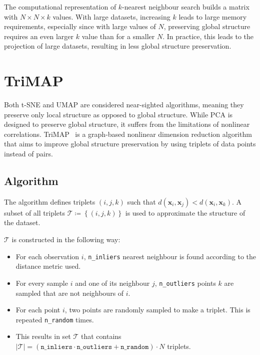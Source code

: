 The computational representation of $k$-nearest neighbour search builds a matrix with $N \times N \times k$ values. With large datasets, increasing $k$ leads to large memory requirements, especially since with large values of $N$, preserving global structure requires an even larger $k$ value than for a smaller $N$. In practice, this leads to the projection of large datasets, resulting in less global structure preservation.

\section{TriMAP}\label{sec:trimap}

Both t-SNE and UMAP are considered near-sighted algorithms, meaning they preserve only local structure as opposed to global structure. While PCA is designed to preserve global structure, it suffers from the limitations of nonlinear correlations. TriMAP~\cite{bib:trimap} is a graph-based nonlinear dimension reduction algorithm that aims to improve global structure preservation by using triplets of data points instead of pairs.



\subsection{Algorithm}

The algorithm defines triplets $(i, j, k)$ such that $d(\mathbf{x}_i, \mathbf{x}_j) < d(\mathbf{x}_i, \mathbf{x}_k)$. A subset of all triplets $\mathcal{T} \coloneqq \left\lbrace (i,j,k) \right\rbrace$ is used to approximate the structure of the dataset.

$\mathcal{T}$ is constructed in the following way:

\begin{itemize}
	\item For each observation $i$, \texttt{n\_inliers} nearest neighbour is found according to the distance metric used.
	\item For every sample $i$ and one of its neighbour $j$, \texttt{n\_outliers} points $k$ are sampled that are not neighbours of $i$.
	\item For each point $i$, two points are randomly sampled to make a triplet. This is repeated \texttt{n\_random} times.
	\item This results in set $\mathcal{T}$ that contains $\vert \mathcal{T} \vert = (\texttt{n\_inliers} \cdot \texttt{n\_outliers} + \texttt{n\_random}) \cdot N$ triplets.
\end{itemize}

